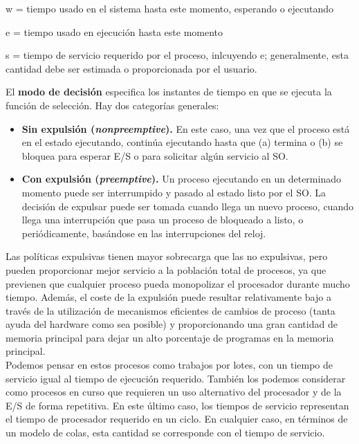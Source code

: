 \documentclass{article}
\begin{document}
				w = tiempo usado en el sistema hasta este momento, esperando o ejecutando
				
				e = tiempo usado en ejecución hasta este momento
				
				s = tiempo de servicio requerido por el proceso, inlcuyendo e; generalmente, esta cantidad debe ser estimada o proporcionada por el usuario.
				
				El \textbf{modo de decisión} especifica los instantes de tiempo en que se ejecuta la función de selección. Hay dos categorías generales:
				
				\begin{itemize}
				\item \textbf{Sin expulsión (\textit{nonpreemptive}).} En este caso, una vez que el proceso está en el estado ejecutando, continúa ejecutando hasta que (a) termina o (b) se bloquea para esperar E/S o para solicitar algún servicio al SO.
				\item \textbf{Con expulsión (\textit{preemptive}).} Un proceso ejecutando en un determinado momento puede ser interrumpido y pasado al estado listo por el SO. La decisión de expulsar puede ser tomada cuando llega un nuevo proceso, cuando llega una interrupción que pasa un proceso de bloqueado a listo, o periódicamente, basándose en las interrupciones del reloj.
				\end{itemize}
				
				Las políticas expulsivas tienen mayor sobrecarga que las no expulsivas, pero pueden proporcionar mejor servicio a la población total de procesos, ya que previenen que cualquier proceso pueda monopolizar el procesador durante mucho tiempo. Además, el coste de la expulsión puede resultar relativamente bajo a través de la utilización de mecanismos eficientes de cambios de proceso (tanta ayuda del hardware como sea posible) y proporcionando una gran cantidad de memoria principal para dejar un alto porcentaje de programas en la memoria principal. \\
				
				Podemos pensar en estos procesos como trabajos por lotes, con un tiempo de servicio igual al tiempo de ejecución requerido. También los podemos considerar como procesos en curso que requieren un uso alternativo del procesador y de la E/S de forma repetitiva. En este último caso, los tiempos de servicio representan el tiempo de procesador requerido en un ciclo. En cualquier caso, en términos de un modelo de colas, esta cantidad se corresponde con el tiempo de servicio. \\
				
\end{document}
